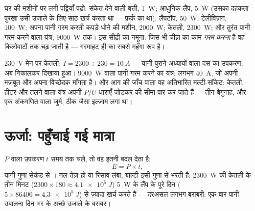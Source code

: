 \begin{example}[घर की सीढ़ी]\label{ex:g9:electric-power-energy:ladder}
घर की मशीनों पर लगी पट्टियाँ पढ़ो: संकेत देने वाली बत्ती, \qty{1}{W};
आधुनिक लैंप, \qty{5}{W} (उसका दहकता पुरखा उसी उजाले के लिए साठ ख़र्च
करता था --- फ़र्क़  का था); लैपटॉप, \qty{50}{W}; टेलीविज़न,
\qty{100}{W}; अपना पानी गरम करती कपड़े धोने की मशीन, \qty{2000}{W};
केतली, \qty{2300}{W}; और तुरंत पानी गरम करने वाला यंत्र, \qty{9000}{W}
तक। इस सीढ़ी का नमूना: जिस भी चीज़ का काम \emph{गरम करना} है वह
किलोवाटों तक चढ़ जाती है --- गरमाहट ही  का सबसे महँगा रूप है।
\end{example}

\begin{example}[फ़्यूज़-डिब्बे का अंकगणित]\label{ex:g9:electric-power-energy:fuses}
\qty{230}{V} मेन पर केतली: $I = 2300 \div 230 = \qty{10}{A}$ ---
यानी पुराने अध्यायों वाला दस  का उपकरण, अब निकालकर दिखाया हुआ।
\qty{9000}{W} वाला पानी गरम करने का यंत्र: लगभग \qty{40}{A}, जो अपनी
मज़बूत  और अपना विच्छेदक माँगता है। और आग की जाँच वाला वह अतिभारित
मल्टी-सॉकेट: केतली, हीटर और तलने वाला यंत्र अपनी $P/U$ धाराएँ जोड़कर
 की सीमा पार कर जाते हैं --- तीन बेगुनाह, और एक अंकगणित वाला जुर्म,
ठीक जैसा इल्ज़ाम लगा था।
\end{example}

\section{ऊर्जा: पहुँचाई गई मात्रा}

\begin{proposition}[शक्ति और समय से ऊर्जा]\label{prop:g9:electric-power-energy:Pt}
$P$  वाला उपकरण $t$ समय तक चले, तो वह इतनी  बदल देता है:
\[
E = P \times t ,
\]
यानी  गुणा सेकंड से । नल तेज़ हो या रिसाव लंबा, बाल्टी इसी गुणा
से भरती है: \qty{2300}{W} की केतली के तीन मिनट ($2300 \times 180
\approx \qty{4.1e5}{J}$) \qty{5}{W} के लैंप के पूरे दिन ($5 \times
86400 = \qty{4.3e5}{J}$) से ज़्यादा ख़र्च करते हैं --- दरअसल लगभग
बराबरी: एक बार पानी उबालना दिन भर के अच्छे उजाले के बराबर।
\end{proposition}

